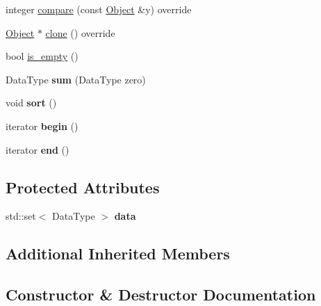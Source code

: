 \begin{DoxyCompactItemize}
\item 
integer \hyperlink{classez_1_1objects_1_1Set_aeaab2cadd3a001a94acb40d7cf2b2b00}{compare} (const \hyperlink{classez_1_1objects_1_1Object}{Object} \&y) override
\item 
\hyperlink{classez_1_1objects_1_1Object}{Object} $\ast$ \hyperlink{classez_1_1objects_1_1Set_a1faa8b09dc50d82e203d3e31f3b9f33e}{clone} () override
\item 
bool \hyperlink{classez_1_1objects_1_1Set_a0b65ed5aee3fa32d0ddcb5a4a89f4dc3}{is\+\_\+empty} ()
\item 
\mbox{\label{classez_1_1objects_1_1Set_a7b27ebf6feeb83f6c1a5d167f5cb25be}} 
Data\+Type {\bfseries sum} (Data\+Type zero)
\item 
\mbox{\label{classez_1_1objects_1_1Set_ab8e5fecd8078714c3bdebed0ba3f60eb}} 
void {\bfseries sort} ()
\item 
\mbox{\label{classez_1_1objects_1_1Set_ad75d62e5e34a3954100f817bd6d281a4}} 
iterator {\bfseries begin} ()
\item 
\mbox{\label{classez_1_1objects_1_1Set_a6d09c0a3f3482c1419e810da0ee7c1a1}} 
iterator {\bfseries end} ()
\end{DoxyCompactItemize}
\subsection*{Protected Attributes}
\begin{DoxyCompactItemize}
\item 
\mbox{\label{classez_1_1objects_1_1Set_aa736747be215dbb5611c9954d084e53a}} 
std\+::set$<$ Data\+Type $>$ {\bfseries data}
\end{DoxyCompactItemize}
\subsection*{Additional Inherited Members}


\subsection{Constructor \& Destructor Documentation}
\mbox{\label{classez_1_1objects_1_1Set_ac76e5e6f5cc80a3ad3d89b4ba8d8def4}} 
